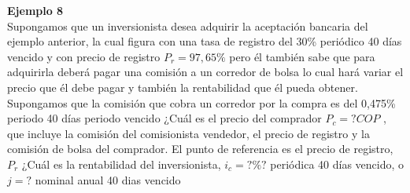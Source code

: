 
\textbf{Ejemplo 8}\\
Supongamos que un inversionista desea adquirir la aceptación bancaria del ejemplo anterior, la cual figura con una tasa de registro del 30\% periódico 40 días vencido y con precio de registro $P_r =  97,65\%$ pero él también sabe que para adquirirla deberá pagar una comisión a un corredor de bolsa lo cual hará variar el precio que él debe pagar y también la rentabilidad que él pueda obtener. Supongamos que la comisión que cobra un corredor por la compra es del 0,475\% periodo 40 días periodo vencido ¿Cuál es el precio del comprador $P_c =  ? COP$ , que incluye la comisión del comisionista vendedor, el precio de registro y la comisión de bolsa del comprador. El punto de referencia es el precio de registro, $P_r$ ¿Cuál es la rentabilidad del inversionista, $i_c =? \%? $ periódica 40 días vencido, o $j=? $ nominal anual 40 dias vencido

